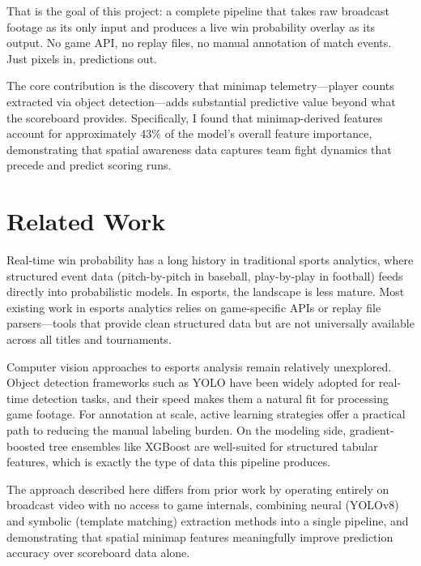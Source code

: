 \documentclass[10pt, twocolumn]{article}
\begin{document}
That is the goal of this project: a complete pipeline that takes raw broadcast footage as its only input and produces a live win probability overlay as its output. No game API, no replay files, no manual annotation of match events. Just pixels in, predictions out.

The core contribution is the discovery that minimap telemetry---player counts extracted via object detection---adds substantial predictive value beyond what the scoreboard provides. Specifically, I found that minimap-derived features account for approximately 43\% of the model's overall feature importance, demonstrating that spatial awareness data captures team fight dynamics that precede and predict scoring runs.

\section{Related Work}

Real-time win probability has a long history in traditional sports analytics, where structured event data (pitch-by-pitch in baseball, play-by-play in football) feeds directly into probabilistic models. In esports, the landscape is less mature. Most existing work in esports analytics relies on game-specific APIs or replay file parsers---tools that provide clean structured data but are not universally available across all titles and tournaments.

Computer vision approaches to esports analysis remain relatively unexplored. Object detection frameworks such as YOLO \cite{jocher2023yolo} have been widely adopted for real-time detection tasks, and their speed makes them a natural fit for processing game footage. For annotation at scale, active learning strategies \cite{settles2009active} offer a practical path to reducing the manual labeling burden. On the modeling side, gradient-boosted tree ensembles like XGBoost \cite{chen2016xgboost} are well-suited for structured tabular features, which is exactly the type of data this pipeline produces.

The approach described here differs from prior work by operating entirely on broadcast video with no access to game internals, combining neural (YOLOv8) and symbolic (template matching) extraction methods into a single pipeline, and demonstrating that spatial minimap features meaningfully improve prediction accuracy over scoreboard data alone.
\end{document}

